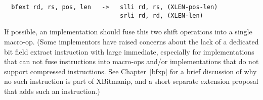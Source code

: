 \begin{verbatim}
  bfext rd, rs, pos, len   ->   slli rd, rs, (XLEN-pos-len)
                                srli rd, rd, (XLEN-len)
\end{verbatim}

If possible, an implementation should fuse this two shift operations into a single
macro-op. (Some implementors have raised concerns about the lack of a dedicated
bit field extract instruction with large immediate, especially for implementations
that can not fuse instructions into macro-ops and/or implementations that do
not support compressed instructions. See Chapter~\ref{bfxp} for a brief discussion
of why no such instruction is part of XBitmanip, and a short separate extension
proposal that adds such an instruction.)
